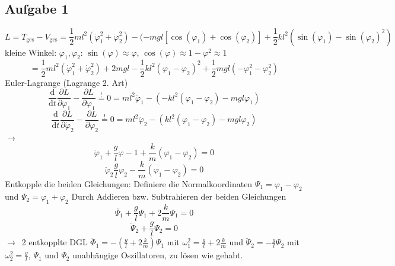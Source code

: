 \documentclass[oneside]{book}
\theoremstyle{definition}
\newcommand{\conseq}{$\rightarrow$~}
\renewcommand{\d}{\mathrm d}
\newcommand{\dd}[1]{\frac{\d}{\d #1}}
\newcommand{\ffpartial}[2]{\frac{\partial #1}{\partial #2}}
\newcommand{\vp}{\varphi}
\newcommand{\dvp}{\dot{\vp}}
\newcommand{\ddvp}{\ddot{\vp}}
\begin{document}
\subsection{Aufgabe 1}
$$L = T_\text{ges} - V_\text{ges} = \frac12 ml^2 (\dot{\varphi}_1^2 + \dot{\varphi}_2^2) - (- mgl [\cos(\varphi_1) + \cos(\varphi_2)] + \frac12 k l^2 (\sin(\varphi_1) - \sin(\vp_2)^2)$$
kleine Winkel: $\vp_1, \vp_2$: $\sin(\vp) \approx \vp$, $\cos(\vp) \approx 1 - \vp^2 \approx 1$
$$ = \frac12 ml^2 (\dot{\vp}_1^2 + \dot{\vp}_2^2) + 2mgl - \frac12 kl^2 (\vp_1 - \vp_2)^2 + \frac12 mgl(-\vp_1^2 - \vp_2^2)$$
Euler-Lagrange (Lagrange 2. Art)
$$\dd t \ffpartial{L}{\dvp_1} - \ffpartial{L}{\vp_1} \overset{!}{=} 0 = ml^2 \ddvp_1 - (-kl^2 (\vp_1 - \vp_2) - mgl\vp_1)$$
$$\dd t \ffpartial{L}{\dvp_2} - \ffpartial{L}{\vp_2} \overset{!}{=} 0 = ml^2 \ddvp_2 - (kl^2 (\vp_1 - \vp_2) - mgl\vp_2)$$
\conseq $$\ddvp_1 + \frac{g}{l} \vp-1 + \frac{k}{m}(\vp_1 - \vp_2) = 0$$
$$\ddvp_2 \frac{g}{l} \vp_2 - \frac{k}{m} (\vp_1 - \vp_2) = 0$$
Entkopple die beiden Gleichungen: Definiere die Normalkoordinaten $\Psi_1 = \vp_1 - \vp_2$ und $\Psi_2 = \vp_1 + \vp_2$
Durch Addieren bzw. Subtrahieren der beiden Gleichungen
$$\ddot{\Psi_1} + \frac{g}{l} \Psi_1 + 2 \frac{k}{m} \Psi_1 = 0$$
$$\ddot{\Psi}_2 + \frac{g}{l} \Psi_2 = 0$$
\conseq 2 entkopplte DGL
$\ddot{\Phi}_1 = - (\frac{g}{l} + 2 \frac{k}{m}) \Psi_1$ mit $\omega_1^2 = \frac{g}{l} + 2 \frac{k}{m}$ und $\ddot{\Psi}_2 = - \frac{g}{l} \Psi_2$ mit $\omega_2^2 = \frac{g}{l}$, $\Psi_1$ und $\Psi_2$ unabhängige Oszillatoren, zu lösen wie gehabt.
\end{document}
